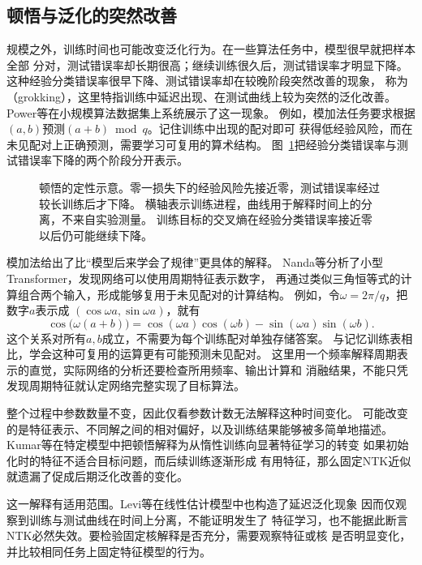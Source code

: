 \subsection{顿悟与泛化的突然改善}
\label{sec:grokking}

规模之外，训练时间也可能改变泛化行为。在一些算法任务中，模型很早就把样本全部
分对，测试错误率却长期很高；继续训练很久后，测试错误率才明显下降。
这种经验分类错误率很早下降、测试错误率却在较晚阶段突然改善的现象，
称为（grokking），这里特指训练中延迟出现、在测试曲线上较为突然的泛化改善。
Power等在小规模算法数据集上系统展示了这一现象。
例如，模加法任务要求根据$(a,b)$预测$(a+b)\bmod q$。记住训练中出现的配对即可
获得低经验风险，而在未见配对上正确预测，需要学习可复用的算术结构。
图~\ref{fig:learning-grokking}把经验分类错误率与测试错误率下降的两个阶段分开表示。

\begin{figure}[!htb]
 \centering
 
 \caption{顿悟的定性示意。零一损失下的经验风险先接近零，测试错误率经过较长训练后才下降。
 横轴表示训练进程，曲线用于解释时间上的分离，不来自实验测量。
 训练目标的交叉熵在经验分类错误率接近零以后仍可能继续下降。}
 \label{fig:learning-grokking}
\end{figure}

模加法给出了比“模型后来学会了规律”更具体的解释。
Nanda等分析了小型Transformer，发现网络可以使用周期特征表示数字，
再通过类似三角恒等式的计算组合两个输入，形成能够复用于未见配对的计算结构。
例如，令$\omega=2\pi/q$，把数字$a$表示成
$(\cos\omega a,\sin\omega a)$，就有
\[
 \cos\bigl(\omega(a+b)\bigr)
 =\cos(\omega a)\cos(\omega b)-\sin(\omega a)\sin(\omega b).
\]
这个关系对所有$a,b$成立，不需要为每个训练配对单独存储答案。
与记忆训练表相比，学会这种可复用的运算更有可能预测未见配对。
这里用一个频率解释周期表示的直觉，实际网络的分析还要检查所用频率、输出计算和
消融结果，不能只凭发现周期特征就认定网络完整实现了目标算法。

整个过程中参数数量不变，因此仅看参数计数无法解释这种时间变化。
可能改变的是特征表示、不同解之间的相对偏好，以及训练结果能够被多简单地描述。
Kumar等在特定模型中把顿悟解释为从惰性训练向显著特征学习的转变 如果初始化时的特征不适合目标问题，而后续训练逐渐形成
有用特征，那么固定NTK近似就遗漏了促成后期泛化改善的变化。

这一解释有适用范围。Levi等在线性估计模型中也构造了延迟泛化现象 因而仅观察到训练与测试曲线在时间上分离，不能证明发生了
特征学习，也不能据此断言NTK必然失效。要检验固定核解释是否充分，需要观察特征或核
是否明显变化，并比较相同任务上固定特征模型的行为。

